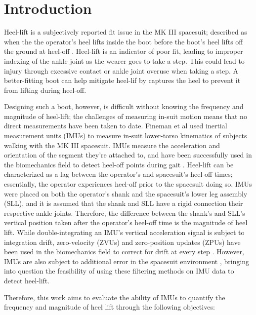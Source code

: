 \documentclass[defaultstyle,11pt]{comps}
\begin{document}
\hypertarget{introduction}{%
\section{Introduction}\label{introduction}}

Heel-lift is a subjectively reported fit issue in the MK III spacesuit; described as when the the operator's heel lifts inside the boot before the boot's heel lifts off the ground at heel-off \citep{Fineman2018}.
Heel-lift is an indicator of poor fit, leading to improper indexing of the ankle joint as the wearer goes to take a step.
This could lead to injury through excessive contact or ankle joint overuse when taking a step.
A better-fitting boot can help mitigate heel-lif by captures the heel to prevent it from lifting during heel-off.

Designing such a boot, however, is difficult without knowing the frequency and magnitude of heel-lift; the challenges of measuring in-suit motion means that no direct measurements have been taken to date.
Fineman et al \citep{Fineman2018} used inertial measurement units (IMUs) to measure in-suit lower-torso kinematics of subjects walking with the MK III spacesuit.
IMUs measure the acceleration and orientation of the segment they're attached to, and have been successfully used in the biomechanics field to detect heel-off points during gait \citep{Rebula2013, Fischer2013}.
Heel-lift can be characterized as a lag between the operator's and spacesuit's heel-off times; essentially, the operator experiences heel-off prior to the spacesuit doing so.
IMUs were placed on both the operator's shank and the spacesuit's lower leg assembly (SLL), and it is assumed that the shank and SLL have a rigid connection their respective ankle joints.
Therefore, the difference between the shank's and SLL's vertical position taken after the operator's heel-off time is the magnitude of heel lift.
While double-integrating an IMU's vertical acceleration signal is subject to integration drift, zero-velocity (ZVUs) and zero-position updates (ZPUs) have been used in the biomechanics field to correct for drift at every step \citep{Feliz2009, Rebula2013}.
However, IMUs are also subject to additional error in the spacesuit environment \citep{Bertrand2016, Shen2019, Shen2020}, bringing into question the feasibility of using these filtering methods on IMU data to detect heel-lift.

Therefore, this work aims to evaluate the ability of IMUs to quantify the frequency and magnitude of heel lift through the following objectives:
\end{document}
